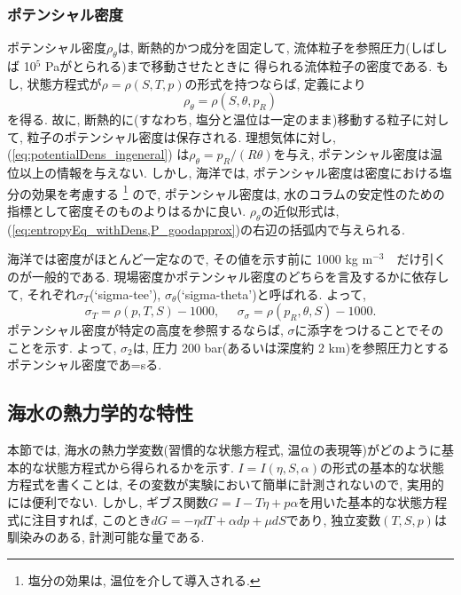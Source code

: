 \subsubsection*{ポテンシャル密度}
ポテンシャル密度$\rho_\theta$は, 断熱的かつ成分を固定して, 流体粒子を参照圧力(しばしば 10$^5$ Paがとられる)まで移動させたときに
得られる流体粒子の密度である. 
もし, 状態方程式が$\rho=\rho(S,T,p)$の形式を持つならば, 定義により
\begin{equation}
 \rho_\theta = \rho(S,\theta, p_R)
 \label{eq:potentialDens_ingeneral}
\end{equation}
を得る. 
故に, 断熱的に(すなわち, 塩分と温位は一定のまま)移動する粒子に対して, 粒子のポテンシャル密度は保存される. 
理想気体に対し, (\ref{eq:potentialDens_ingeneral}) は$\rho_\theta = p_R/(R\theta)$を与え, 
ポテンシャル密度は温位以上の情報を与えない. 
しかし, 海洋では, ポテンシャル密度は密度における塩分の効果を考慮する%
\footnote{
塩分の効果は, 温位を介して導入される. 
}
ので, ポテンシャル密度は, 
水のコラムの安定性のための指標として密度そのものよりはるかに良い. 
$\rho_\theta$の近似形式は, (\ref{eq:entropyEq_withDens,P_goodapprox})の右辺の括弧内で与えられる. 
 
海洋では密度がほとんど一定なので, 
その値を示す前に 1000 kg m$^{-3}$　だけ引くのが一般的である. 
現場密度かポテンシャル密度のどちらを言及するかに依存して, 
それぞれ$\sigma_T$(`sigma-tee'), $\sigma_\theta$(`sigma-theta')と呼ばれる. 
よって, 
\begin{equation}
 \sigma_T = \rho(p,T,S) - 1000, \;\;\;\;\;
 \sigma_\sigma = \rho(p_R,\theta,S) - 1000. 
\end{equation}
ポテンシャル密度が特定の高度を参照するならば, $\sigma$に添字をつけることでそのことを示す. 
よって, $\sigma_2$は, 圧力 200 bar(あるいは深度約 2 km)を参照圧力とするポテンシャル密度であ=sる. 

\subsection{海水の熱力学的な特性}
本節では, 海水の熱力学変数(習慣的な状態方程式, 温位の表現等)がどのように基本的な状態方程式から得られるかを示す. 
$I=I(\eta,S,\alpha)$の形式の基本的な状態方程式を書くことは, その変数が実験において簡単に計測されないので, 
実用的には便利でない. 
しかし, ギブス関数$G=I - T\eta + p\alpha$を用いた基本的な状態方程式に注目すれば, 
このとき$dG = -\eta dT + \alpha dp + \mu dS$であり, 
独立変数$(T,S,p)$は馴染みのある, 計測可能な量である. 

